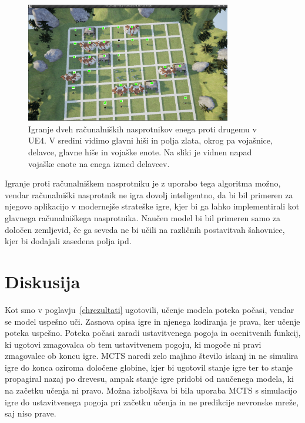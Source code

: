 \documentclass[a4paper, 12pt]{book}
\begin{document}
\begin{figure}[h!]
	\begin{center}
		\includegraphics[width=0.8\textwidth]{photos/ue4attack.pdf}
	\end{center}
	\caption{Igranje dveh računalniških nasprotnikov enega proti drugemu v UE4. V sredini vidimo glavni hiši in polja zlata, okrog pa vojašnice, delavce, glavne hiše in vojaške enote.
		Na sliki je vidnen napad vojaške enote na enega izmed delavcev. }
	\label{visualization_ue4}
\end{figure}

Igranje proti računalniškem nasprotniku je z uporabo tega algoritma možno, vendar računalniški nasprotnik ne igra dovolj inteligentno, da bi bil primeren za njegovo aplikacijo v modernejše strateške igre, kjer bi ga lahko implementirali kot glavnega računalniškega nasprotnika.
Naučen model bi bil primeren samo za določen zemljevid, če ga seveda ne bi učili na različnih postavitvah šahovnice, kjer bi dodajali zasedena polja ipd.


\chapter{Diskusija}
\label{chdiskusija}

Kot smo v poglavju~\ref{chrezultati} ugotovili, učenje modela poteka počasi, vendar se model uspešno uči.
Zasnova opisa igre in njenega kodiranja je prava, ker učenje poteka uspešno.
Poteka počasi zaradi ustavitvenega pogoja in ocenitvenih funkcij, ki ugotovi zmagovalca ob tem ustavitvenem pogoju, ki mogoče ni pravi zmagovalec ob koncu igre.
MCTS naredi zelo majhno število iskanj in ne simulira igre do konca oziroma določene globine, kjer bi ugotovil stanje igre ter to stanje propagiral nazaj po drevesu, ampak stanje igre pridobi od naučenega modela, ki na začetku učenja ni pravo.
Možna izboljšava bi bila uporaba MCTS s simulacijo igre do ustavitvenega pogoja pri začetku učenja in ne predikcije nevronske mreže, saj niso prave.
\end{document}
